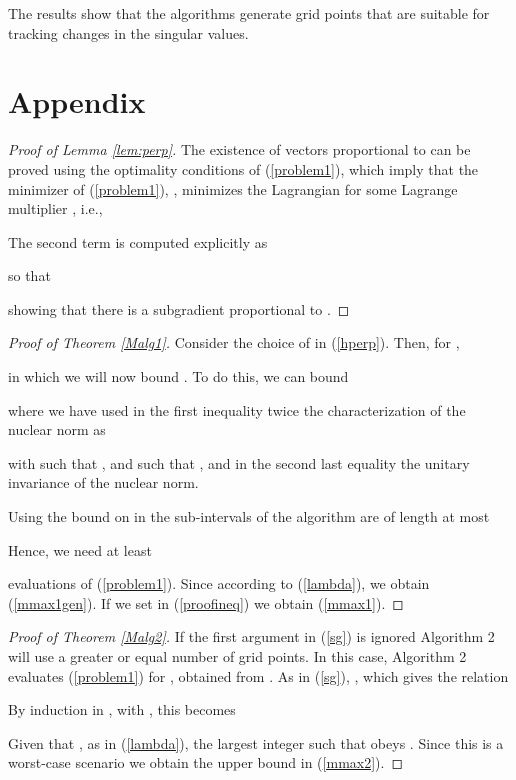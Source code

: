 \documentclass{article}
\begin{document}
The results show that the algorithms generate grid points that are suitable for tracking changes in the singular values.

\section{Appendix}
\begin{proof}[Proof of Lemma \ref{lem:perp}]
The existence of vectors proportional to  can be proved using the optimality conditions of (\ref{problem1}), which imply that the minimizer of (\ref{problem1}), , minimizes the Lagrangian  for some Lagrange multiplier  \cite[pp.~217]{Luenberger-69}, i.e.,

The second term is computed explicitly as

so that

showing that there is a subgradient proportional to .
\end{proof}

\begin{proof}[Proof of Theorem \ref{Malg1}]
Consider the choice of  in (\ref{hperp}). Then, for ,

in which we will now bound . To do this, we can bound

where we have used in the first inequality twice the characterization of the nuclear norm as

with  such that , and  such that , and in the second last equality the unitary invariance of the nuclear norm.

Using the bound on  in  the sub-intervals of the algorithm are of length at most

Hence, we need at least

evaluations of (\ref{problem1}). Since  according to (\ref{lambda}), we obtain (\ref{mmax1gen}). If we set  in (\ref{proofineq}) we obtain (\ref{mmax1}).
\end{proof}

\begin{proof}[Proof of Theorem \ref{Malg2}]
If the first argument in (\ref{sg}) is ignored Algorithm 2 will use a greater or equal number of grid points. In this case, Algorithm 2 evaluates (\ref{problem1}) for , obtained from . As in (\ref{sg}), , which gives the relation

By induction in , with , this becomes

Given that , as in (\ref{lambda}), the largest integer  such that  obeys . Since this is a worst-case scenario we obtain the upper bound in (\ref{mmax2}).
\end{proof}



\end{document}
